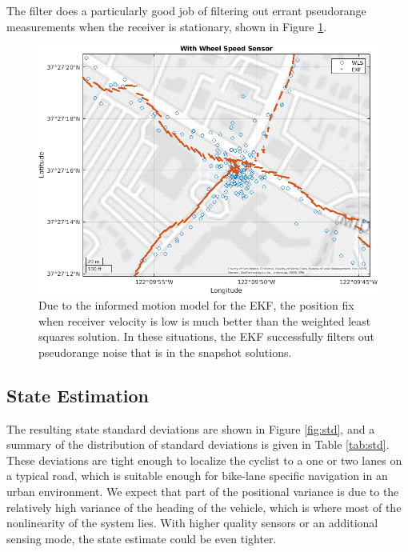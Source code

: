 \documentclass[letterpaper,times]{IONconf}
\begin{document}
The filter does a particularly good job of filtering out errant pseudorange measurements when the receiver is stationary, shown in Figure \ref{fig:stationary}.

\begin{figure}
    \centering
    \includegraphics[width=.7\textwidth]{intersect_whl}
    \caption{Due to the informed motion model for the EKF, the position fix when receiver velocity is low is much better than the weighted least squares solution. In these situations, the EKF successfully filters out pseudorange noise that is in the snapshot solutions.}\label{fig:stationary}
\end{figure}

\subsection{State Estimation}

The resulting state standard deviations are shown in Figure \ref{fig:std}, and a summary of the distribution of standard deviations is given in Table \ref{tab:std}. These deviations are tight enough to localize the cyclist to a one or two lanes on a typical road, which is suitable enough for bike-lane specific navigation in an urban environment. We expect that part of the positional variance is due to the relatively high variance of the heading of the vehicle, which is where most of the nonlinearity of the system lies. With higher quality sensors or an additional sensing mode, the state estimate could be even tighter. 
\end{document}
